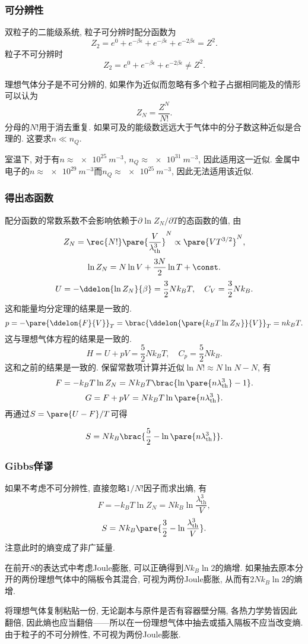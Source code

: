 \documentclass[../Thermal.tex]{subfiles}
\begin{document}
\subsubsection{可分辨性}
\begin{ex}
双粒子的二能级系统, 粒子可分辨时配分函数为
\[ Z_2 = e^0 + e^{-\beta\epsilon} + e^{-\beta\epsilon} + e^{-2\beta\epsilon} = Z^2. \]
粒子不可分辨时
\[ Z_2 = e^0 + e^{-\beta\epsilon} + e^{-2\beta\epsilon} \neq Z^2. \]
\end{ex}
理想气体分子是不可分辨的, 如果作为近似而忽略有多个粒子占据相同能及的情形可以认为
\[ Z_N = \frac{Z^N}{N!}. \]
分母的$N!$用于消去重复. 如果可及的能级数远远大于气体中的分子数这种近似是合理的. 这要求$n \ll n_Q$.
\begin{ex}
室温下, 对于有$n\approx\SI{e25}{m^{-3}}$, $n_Q\approx\SI{e31}{m^{-3}}$, 因此适用这一近似. 金属中电子的$n\approx\SI{e29}{m^{-3}}$而$n_Q\approx\SI{e25}{m^{-3}}$, 因此无法适用该近似.
\end{ex}
\subsubsection{得出态函数}
配分函数的常数系数不会影响依赖于$\partial \ln Z_N/\partial T$的态函数的值, 由
\[ Z_N = \rec{N!}\pare{\frac{V}{\lambda_{\mathrm{th}}^3}}^N \propto \pare{VT^{3/2}}^N, \]
\[ \ln Z_N = N \ln V + \frac{3N}{2}\ln T + \const. \]
\[ U = -\ddelon{\ln Z_N}{\beta} = \frac{3}{2}Nk_BT,\quad C_V = \frac{3}{2}Nk_B. \]
这和能量均分定理的结果是一致的.
\[ p = -\pare{\ddelon{F}{V}}_T = \brac{\ddelon{\pare{k_B T\ln Z_N}}{V}}_T = nk_BT. \]
这与理想气体方程的结果是一致的.
\[ H = U + pV = \frac{5}{2}Nk_BT,\quad C_p = \frac{5}{2}Nk_B. \]
这和之前的结果是一致的. 保留常数项计算并近似$\ln N! \approx N\ln N - N$, 有
\[ F = -k_BT\ln Z_N = Nk_BT\brac{\ln\pare{n\lambda_{\mathrm{th}}^3} - 1}. \]
\begin{equation}
\label{eq:gofidealgases}
G = F + pV = Nk_BT\ln\pare{n\lambda_{\mathrm{th}}^3}.
\end{equation}
再通过$S = \pare{U-F}/T$可得
\begin{finale}
\begin{corollary}
\[ S = Nk_B\brac{\frac{5}{2}-\ln\pare{n\lambda_{\mathrm{th}}^3}}. \]
\end{corollary}
\end{finale}
\subsubsection{Gibbs佯谬}
\begin{ex}
如果不考虑不可分辨性, 直接忽略$1/N!$因子而求出熵, 有
\[ F = -k_BT\ln Z_N = Nk_B\ln\frac{\lambda_{\mathrm{th}}^3}{V}, \]
\[ S = Nk_B\pare{\frac{3}{2} - \ln\frac{\lambda_{\mathrm{th}}^3}{V}}. \]
注意此时的熵变成了非广延量.
\end{ex}
在前开$S$的表达式中考虑Joule膨胀, 可以正确得到$Nk_B\ln 2$的熵增. 如果抽去原本分开的两份理想气体中的隔板令其混合, 可视为两份Joule膨胀, 从而有$2Nk_B\ln 2$的熵增.
\begin{ex}
将理想气体复制粘贴一份, 无论副本与原件是否有容器壁分隔, 各热力学势皆因此翻倍, 因此熵也应当翻倍——所以在一份理想气体中抽去或插入隔板不应当改变熵. 由于粒子的不可分辨性, 不可视为两份Joule膨胀.
\end{ex}
\end{document}
